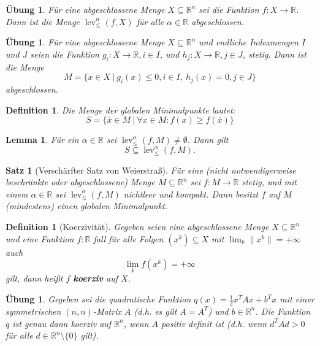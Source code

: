 \documentclass[11pt]{scrreprt}
\newcounter{thm}
\theoremstyle{thmstyle}
\numberwithin{thm}{section}
\newtheorem{definition}[thm]{Definition}
\newtheorem{lemma}[thm]{Lemma}
\newtheorem{satz}[thm]{Satz}
\newtheorem{uebung}[thm]{Übung}
\newtheorem*{definition*}{Definition}
\begin{document}
\setcounter{thm}{9}

\begin{uebung}
	Für eine abgeschlossene Menge $X \subseteq \mathbb{R}^n$ sei die Funktion $f \colon X \rightarrow \mathbb{R}$. Dann ist die Menge $\operatorname{lev}_{\leq}^{\alpha}(f, X)$ für alle $\alpha \in \mathbb{R}$ abgeschlossen.	
\end{uebung}

\begin{uebung}
	Für eine abgeschlossene Menge $X \subseteq \mathbb{R}^n$ und endliche Indexmengen $I$ und $J$ seien die Funktion $g_i \colon X \rightarrow \mathbb{R}, i \in I$, und $h_j \colon X \rightarrow \mathbb{R}, j \in J$, stetig. Dann ist die Menge 
		$$ M = \big\{ x \in X ~|~g_i(x) \leq 0, i \in I, ~ h_j(x) = 0, j \in J \big\} $$
		abgeschlossen.	
\end{uebung}

\begin{definition*}
	Die Menge der globalen Minimalpunkte lautet:
	$$ S = \big\{ \overline{x} \in M ~|~ \forall x \in M: f(x) \geq f(\overline{x}) \big\} $$
\end{definition*}

\begin{lemma}
	Für ein $\alpha \in \mathbb{R}$ sei $\operatorname{lev}_{\leq}^{\alpha}(f, M) \neq \emptyset$. Dann gilt 
	$$ S \subseteq \operatorname{lev}_{\leq}^{\alpha}(f, M). $$
\end{lemma}

\begin{satz}[Verschärfter Satz von Weierstraß]
	Für eine (nicht notwendigerweise beschränkte oder abgeschlossene) Menge $M \subseteq \mathbb{R}^n$ sei $f \colon M \rightarrow \mathbb{R}$ stetig, und mit einem $\alpha \in \mathbb{R}$ sei $\operatorname{lev}_{\leq}^{\alpha}(f, M)$ nichtleer und kompakt. Dann besitzt $f$ auf $M$ (mindestens) einen globalen Minimalpunkt.
\end{satz}

\setcounter{thm}{20}

\begin{definition}[Koerzivität]
	Gegeben seien eine abgeschlossene Menge $X \subseteq \mathbb{R}^n$ und eine Funktion $f \colon \mathbb{R}$ fall für alle Folgen $(x^k) \subseteq X$ mit $\lim_k \| x^k \| = +\infty$ auch
	$$ \lim_k f(x^k) = +\infty $$
	gilt, dann heißt $f$ \textbf{koerziv} auf $X$.
\end{definition}

\setcounter{thm}{23}

\begin{uebung}
		Gegeben sei die quadratische Funktion $q(x) = \frac{1}{2} x^T A x + b^T x$ mit einer symmetrischen $(n, n)$-Matrix $A$ (d.h. es gilt $A = A^T$) und $b \in \mathbb{R}^n$. Die Funktion $q$ ist genau dann koerziv auf $\mathbb{R}^n$, wenn $A$ positiv definit ist (d.h. wenn $d^T A d > 0$ für alle $d\in \mathbb{R}^n \setminus \{ 0 \}$ gilt).
\end{uebung}
\end{document}

